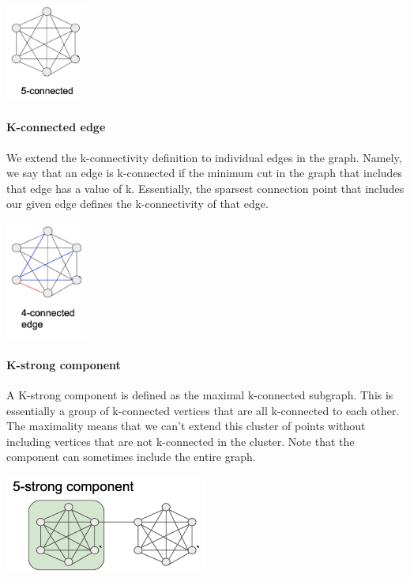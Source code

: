 \documentclass[11pt]{article}
\begin{document}
\begin{center}
\includegraphics[width=0.2\textwidth]{figures/k_connected.png}
\end{center}

\paragraph{K-connected edge}
We extend the k-connectivity definition to individual edges in the graph. Namely, we say that an edge is k-connected if the minimum cut in the graph that includes that edge has a value of k. Essentially, the sparsest connection point that includes our given edge defines the k-connectivity of that edge.

\begin{center}
\includegraphics[width=0.2\textwidth]{figures/k_connected_edge.png}
\end{center}

\paragraph{K-strong component}
A K-strong component is defined as the maximal k-connected subgraph. This is essentially a group of k-connected vertices that are all k-connected to each other. The maximality means that we can't extend this cluster of points without including vertices that are not k-connected in the cluster. Note that the component can sometimes include the entire graph. 

\begin{center}
\includegraphics[width=0.5\textwidth]{figures/k_strong_component.png}
\end{center}
\end{document}
